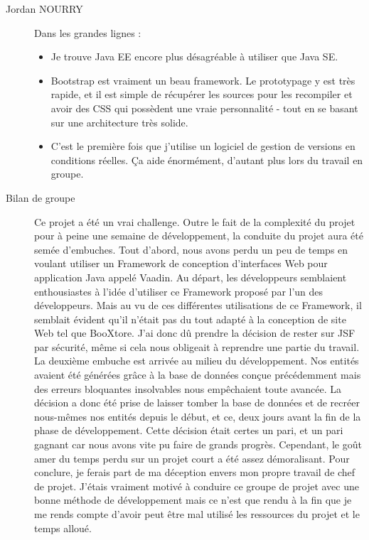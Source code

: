 \begin{description}
	\item[Jordan NOURRY]
	Dans les grandes lignes :
		\begin{itemize}
			\item Je trouve Java EE encore plus désagréable à utiliser que Java SE.
			\item Bootstrap est vraiment un beau framework. Le prototypage y est très rapide, et il est simple de récupérer les sources pour les recompiler et avoir des CSS qui possèdent une vraie personnalité - tout en se basant sur une architecture très solide.
			\item C'est le première fois que j'utilise un logiciel de gestion de versions en conditions réelles. Ça aide énormément, d'autant plus lors du travail en groupe.
		\end{itemize}
	\item[Bilan de groupe]
	Ce projet a été un vrai challenge. Outre le fait de la complexité du projet pour à peine une semaine de développement, la conduite du projet aura été semée d’embuches. Tout d’abord, nous avons perdu un peu de temps en voulant utiliser un Framework de conception d’interfaces Web pour application Java appelé Vaadin. Au départ, les développeurs semblaient enthousiastes à l’idée d’utiliser ce Framework proposé par l’un des développeurs. Mais au vu de ces différentes utilisations de ce Framework, il semblait évident qu’il n’était pas du tout adapté à la conception de site Web tel que BooXtore. J’ai donc dû prendre la décision de rester sur JSF par sécurité, même si cela nous obligeait à reprendre une partie du travail. La deuxième embuche est arrivée au milieu du développement. Nos entités avaient été générées grâce à la base de données conçue précédemment mais des erreurs bloquantes insolvables nous empêchaient toute avancée. La décision a donc été prise de laisser tomber la base de données et de recréer nous-mêmes nos entités depuis le début, et ce, deux jours avant la fin de la phase de développement. Cette décision était certes un pari, et un pari gagnant car nous avons vite pu faire de grands progrès. Cependant, le goût amer du temps perdu sur un projet court a été assez démoralisant.
	Pour conclure, je ferais part de ma déception envers mon propre travail de chef de projet. J’étais vraiment motivé à conduire ce groupe de projet avec une bonne méthode de développement mais ce n’est que rendu à la fin que je me rends compte d’avoir peut être mal utilisé les ressources du projet et le temps alloué.

\end{description}
